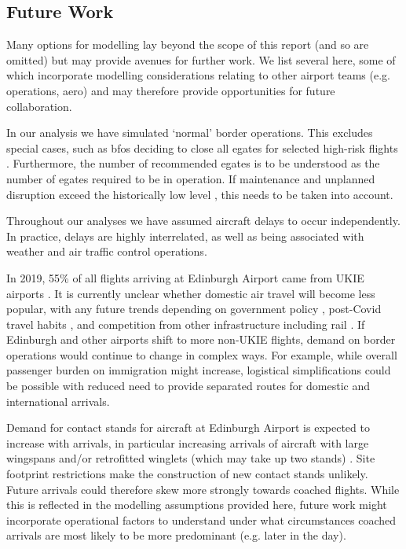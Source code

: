 \documentclass[10pt]{article}
\begin{document}
\vspace{10pt}

\subsection{Future Work}
Many options for modelling lay beyond the scope of this report (and so are omitted) but may provide avenues for further work. We list several here, some of which incorporate modelling considerations relating to other airport teams (e.g. operations, aero) and may therefore provide opportunities for future collaboration.

In our analysis we have simulated `normal' border operations. This excludes special cases, such as \glspl{bfo} deciding to close all \glspl{egate} for selected high-risk flights \cite{Inspection_eGates}.  Furthermore, the number of recommended \glspl{egate} is to be understood as the number of \glspl{egate} required to be in operation. If maintenance and unplanned disruption exceed the historically low level \cite{Inspection_eGates}, this needs to be taken into account.

Throughout our analyses we have assumed aircraft delays to occur independently. In practice, delays are highly interrelated, as well as being associated with weather and air traffic control operations.

In 2019, 55\% of all flights arriving at Edinburgh Airport came from UKIE airports \cite{noise_lab}. It is currently unclear whether domestic air travel will become less popular, with any future trends depending on government policy \cite{flight_tax_independent}, post-Covid travel habits \cite{post_covid_flights}, and competition from other infrastructure including rail \cite{train_airplane_guardian}. If Edinburgh and other airports shift to more non-UKIE flights, demand on border operations would continue to change in complex ways. For example, while overall passenger burden on immigration might increase, logistical simplifications could be possible with reduced need to provide separated routes for domestic and international arrivals.

Demand for contact stands for aircraft at Edinburgh Airport is expected to increase with arrivals, in particular increasing arrivals of aircraft with large wingspans and/or retrofitted winglets (which may take up two stands) \cite{dijk2019recoverable}. Site footprint restrictions make the construction of new contact stands unlikely. Future arrivals could therefore skew more strongly towards coached flights. While this is reflected in the modelling assumptions provided here, future work might incorporate operational factors to understand under what circumstances coached arrivals are most likely to be more predominant (e.g. later in the day). 
\end{document}
